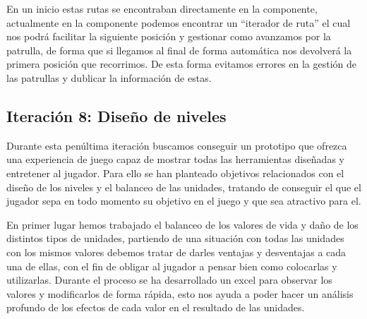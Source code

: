 En un inicio estas rutas se encontraban directamente en la componente, actualmente en la componente podemos
encontrar un ``iterador de ruta'' el cual nos podrá facilitar la siguiente posición y gestionar como avanzamos
por la patrulla, de forma que si llegamos al final de forma automática nos devolverá la primera posición
que recorrimos. De esta forma evitamos errores en la gestión de las patrullas y dublicar la información de estas.
 

\subsection*{Iteración 8: Diseño de niveles}
Durante esta penúltima iteración buscamos conseguir un prototipo que ofrezca una experiencia
de juego capaz de mostrar todas las herramientas diseñadas y entretener al jugador. Para ello se han 
planteado objetivos relacionados con el diseño de los niveles y el balanceo de las unidades, tratando
de conseguir el que el jugador sepa en todo momento su objetivo en el juego y que sea atractivo para el.

En primer lugar hemos trabajado el balanceo de los valores de vida y daño de los distintos tipos de
unidades, partiendo de una situación con todas las unidades con los mismos valores
debemos tratar de darles ventajas y desventajas a cada una de ellas, con el fin de obligar al
jugador a pensar bien como colocarlas y utilizarlas. Durante el proceso se ha desarrollado un excel
para observar los valores y modificarlos de forma rápida, esto nos ayuda a poder hacer un análisis
profundo de los efectos de cada valor en el resultado de las unidades.

